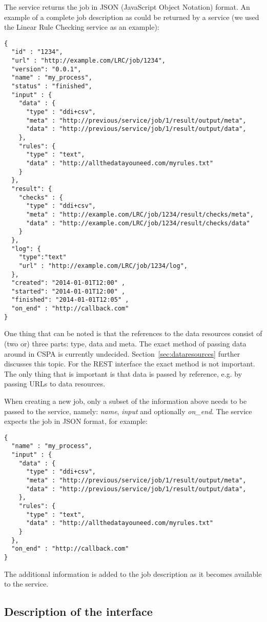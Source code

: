 \documentclass[a4paper]{article}
\begin{document}
The service returns the job in JSON (JavaScript Object Notation) format. An
example of a complete job description as could be returned by a service (we used
the Linear Rule Checking service as an example):
{\small
\begin{Verbatim}
{
  "id" : "1234",
  "url" : "http://example.com/LRC/job/1234",
  "version": "0.0.1",
  "name" : "my_process",
  "status" : "finished",
  "input" : {
    "data" : {
      "type" : "ddi+csv",
      "meta" : "http://previous/service/job/1/result/output/meta",
      "data" : "http://previous/service/job/1/result/output/data",
    },
    "rules": {
      "type" : "text",
      "data" : "http://allthedatayouneed.com/myrules.txt"
    }
  }, 
  "result": {
    "checks" : {
      "type" : "ddi+csv",
      "meta" : "http://example.com/LRC/job/1234/result/checks/meta",
      "data" : "http://example.com/LRC/job/1234/result/checks/data"
    }
  }, 
  "log": {
    "type":"text"
    "url" : "http://example.com/LRC/job/1234/log",
  },
  "created": "2014-01-01T12:00" ,
  "started": "2014-01-01T12:00" ,
  "finished": "2014-01-01T12:05" ,
  "on_end" : "http://callback.com"
}
\end{Verbatim}
}
One thing that can be noted is that the references to the data resources consist
of (two or) three parts: type, data and meta. The exact method of passing data
around in CSPA is currently undecided. Section~\ref{sec:dataresources} further
discusses this topic. For the REST interface the exact method is not important.
The only thing that is important is that data is passed by reference, e.g. by
passing URLs to data resources.

When creating a new job, only a subset of the information above needs to be
passed to the service, namely: \emph{name}, \emph{input} and optionally
\emph{on\_end}. The service expects the job in JSON format, for example:
{\small
\begin{Verbatim}
{
  "name" : "my_process",
  "input" : {
    "data" : {
      "type" : "ddi+csv",
      "meta" : "http://previous/service/job/1/result/output/meta",
      "data" : "http://previous/service/job/1/result/output/data",
    },
    "rules": {
      "type" : "text",
      "data" : "http://allthedatayouneed.com/myrules.txt"
    }
  }, 
  "on_end" : "http://callback.com"
}
\end{Verbatim}
}

The additional information is added to the job description as it becomes
available to the service. 

\subsection{Description of the interface}
\end{document}
